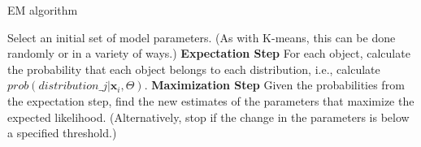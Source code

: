 \begin{algorithm}[H]
\caption{EM algorithm}
\begin{algorithmic}[1]
\State Select an initial set of model parameters.
\State (As with K-means, this can be done randomly or in a variety of ways.)
\Repeat
\State \textbf{Expectation Step} For each object, calculate the probability that each object belongs to each distribution, i.e., calculate $prob(distribution\_j|\mathbf{x}_i, \Theta)$.
\State \textbf{Maximization Step} Given the probabilities from the expectation step, find the new estimates of the parameters that maximize the expected likelihood.
\State (Alternatively, stop if the change in the parameters is below a specified threshold.)
\end{algorithmic}
\end{algorithm}


